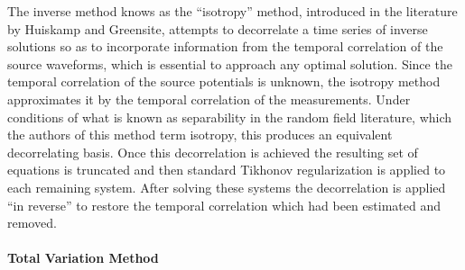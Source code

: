 The inverse method knows as the ``isotropy'' method, introduced in the
literature by Huiskamp and Greensite, attempts to decorrelate a time series
of inverse solutions so as to incorporate information from the temporal
correlation of the source waveforms, which is essential to approach any
optimal solution. Since the temporal correlation of the source potentials
is unknown, the isotropy method approximates it by the temporal correlation
of the measurements. Under conditions of what is known as separability in
the random field literature, which the authors of this method term isotropy,
this produces an equivalent decorrelating basis. Once this decorrelation is
achieved the resulting set of equations is truncated and then standard
Tikhonov regularization is applied to each remaining system. After solving
these systems the decorrelation is applied ``in reverse'' to restore the
temporal correlation which had been estimated and removed.


\paragraph{Total Variation Method}
\subsection{} \label{sec:inv-tv}


